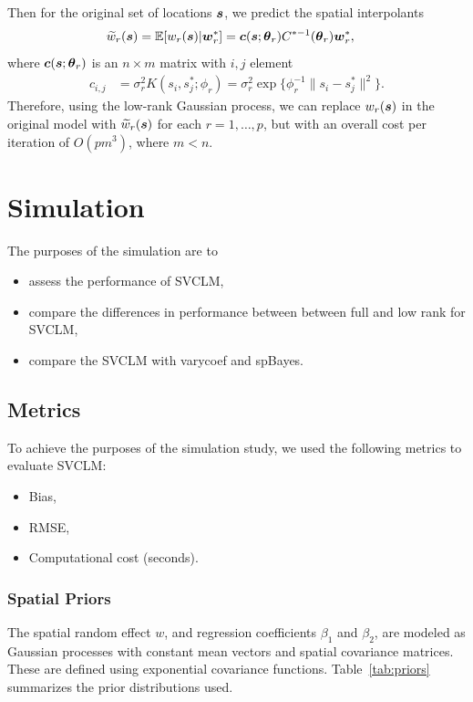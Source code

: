 Then for the original set of locations $\boldsymbol{s}$, we predict the spatial interpolants 
\begin{align*}
    \widetilde{w}_r(\boldsymbol{s}) &= \mathbb{E}[w_r(\boldsymbol{s})|\boldsymbol{w}_r^*] = \boldsymbol{c} (\boldsymbol{s}; \boldsymbol{\theta}_r) C^{*-1}(\boldsymbol{\theta}_r)\boldsymbol{w}_r^*,
\end{align*}
where $\boldsymbol{c} (\boldsymbol{s}; \boldsymbol{\theta}_r)$ is an $n \times m$ matrix with $i, j$ element
\begin{align*}
    c_{i, j} &= \sigma_r^2 K(s_i, s_j^*; \phi_r) = \sigma_r^2 \exp\{\phi_r^{-1}\|s_i-s_j^*\|^2\}.
\end{align*}
Therefore, using the low-rank Gaussian process, we can replace $w_r(\boldsymbol{s})$ in the original model with $\widetilde{w}_r(\boldsymbol{s})$ for each $r = 1, \dots, p$, but with an overall cost per iteration of $O(pm^3)$, where $m < n$.

\section{Simulation}
\label{sec:simulation}
The purposes of the simulation are to 
\begin{itemize}
    \item assess the performance of SVCLM,
    \item compare the differences in performance between between full and low rank for SVCLM,
    \item compare the SVCLM with varycoef and spBayes.
\end{itemize}

\subsection{Metrics}
To achieve the purposes of the simulation study, we used the following metrics to evaluate SVCLM:
\begin{itemize}
    \item Bias,
    \item RMSE,
    \item Computational cost (seconds).
\end{itemize}

\subsubsection{Spatial Priors}

The spatial random effect $ w $, and regression coefficients $ \beta_1 $ and $ \beta_2 $, are modeled as Gaussian processes with constant mean vectors and spatial covariance matrices. These are defined using exponential covariance functions. Table~\ref{tab:priors} summarizes the prior distributions used.

